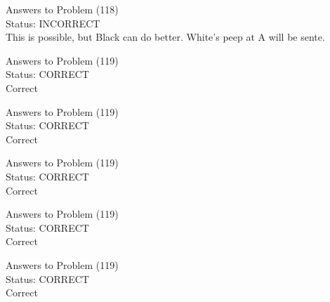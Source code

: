 \documentclass[11pt]{article}
\begin{document}
\begin{minipage}[t]{0.5\textwidth}
  {\centering
  
  Answers to Problem (118)\\
  Status: INCORRECT\\
  This is possible, but Black can do better. White's peep at A will be sente.\\
  }
\end{minipage}
\begin{minipage}[t]{0.5\textwidth}
  {\centering
  
  Answers to Problem (119)\\
  Status: CORRECT\\
  Correct\\
  }
\end{minipage}
\begin{minipage}[t]{0.5\textwidth}
  {\centering
  
  Answers to Problem (119)\\
  Status: CORRECT\\
  Correct\\
  }
\end{minipage}
\begin{minipage}[t]{0.5\textwidth}
  {\centering
  
  Answers to Problem (119)\\
  Status: CORRECT\\
  Correct\\
  }
\end{minipage}
\begin{minipage}[t]{0.5\textwidth}
  {\centering
  
  Answers to Problem (119)\\
  Status: CORRECT\\
  Correct\\
  }
\end{minipage}
\begin{minipage}[t]{0.5\textwidth}
  {\centering
  
  Answers to Problem (119)\\
  Status: CORRECT\\
  Correct\\
  }
\end{minipage}
\end{document}
